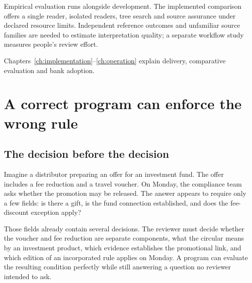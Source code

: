 \documentclass[12pt,a4paper,oneside,openany]{book}
\begin{document}
Empirical evaluation runs alongside development. The implemented comparison
offers a single reader, isolated readers, tree search and source assurance under
declared resource limits. Independent reference outcomes and unfamiliar source
families are needed to estimate interpretation quality; a separate workflow
study measures people's review effort.

\begin{MapDiagram}
\end{MapDiagram}

Chapters~\ref{ch:implementation}--\ref{ch:operation} explain delivery,
comparative evaluation and bank adoption.
\endgroup
\clearpage

\tableofcontents
\mainmatter
\chapter{A correct program can enforce the wrong rule}
\label{ch:problem}

\section{The decision before the decision}
\label{merge:M01:00}

\label{sec:problem-decision}
Imagine a distributor preparing an offer for an investment fund. The offer
includes a fee reduction and a travel voucher. On Monday, the compliance team
asks whether the promotion may be released. The answer appears to require only a
few fields: is there a gift, is the fund connection established, and does the
fee-discount exception apply?

Those fields already contain several decisions. The reviewer must decide whether
the voucher and fee reduction are separate components, what the circular means by
an investment product, which evidence establishes the promotional link, and
which edition of an incorporated rule applies on Monday. A program can evaluate
the resulting condition perfectly while still answering a question no reviewer
intended to ask.
\end{document}
